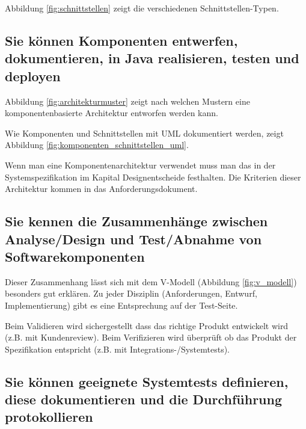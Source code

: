 \newpage

Abbildung \ref{fig:schnittstellen} zeigt die verschiedenen Schnittstellen-Typen.


\subsection{Sie können Komponenten entwerfen, dokumentieren, in Java realisieren, testen und deployen}

Abbildung \ref{fig:architekturmuster} zeigt nach welchen Mustern eine komponentenbasierte Architektur entworfen werden kann.


Wie Komponenten und Schnittstellen mit UML dokumentiert werden, zeigt Abbildung \ref{fig:komponenten_schnittstellen_uml}.


Wenn man eine Komponentenarchitektur verwendet muss man das in der Systemspezifikation im Kapital Designentscheide festhalten. Die Kriterien dieser Architektur kommen in das Anforderungsdokument.

\subsection{Sie kennen die Zusammenhänge zwischen Analyse/Design und Test/Abnahme von Softwarekomponenten}

Dieser Zusammenhang lässt sich mit dem V-Modell (Abbildung \ref{fig:v_modell}) besonders gut erklären. Zu jeder Disziplin (Anforderungen, Entwurf, Implementierung) gibt es eine Entsprechung auf der Test-Seite. 


Beim Validieren wird sichergestellt dass das richtige Produkt entwickelt wird (z.B. mit Kundenreview). Beim Verifizieren wird überprüft ob das Produkt der Spezifikation entspricht (z.B. mit Integrations-/Systemtests).

\newpage

\subsection{Sie können geeignete Systemtests definieren, diese dokumentieren und die Durchführung protokollieren}


